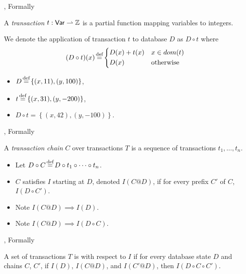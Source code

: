 \documentclass[xcolor={dvipsnames,svgnames,table}]{beamer}
\newcommand{\defeq}{\stackrel{\mathclap{\normalfont\mbox{\scriptsize def}}}{=}}
\newcommand{\set}[1]{\left\{#1\right\}}
\begin{document}
\begin{frame}{\iconfluence{}, Formally}
  \begin{center}
    \huge
    A \emph{transaction} $t: \textsf{Var} \rightharpoonup \mathbb{Z}$ is a partial function
    mapping variables to integers.
  \end{center}
  We denote the application of transaction $t$ to database $D$ as $D \circ t$
  where
  \[
    (D \circ t)(x) \defeq \begin{cases*}
      D(x) + t(x) & $x \in dom(t)$ \\
      D(x)        & otherwise
    \end{cases*}
  \]
  \begin{itemize}
    \item $D \defeq \set{(x, 11), (y, 100)}$,
    \item $t \defeq \set{(x, 31), (y, -200)}$,
    \item $D \circ t = \set{(x, 42), (y, -100)}$.
  \end{itemize}
\end{frame}

\begin{frame}{\iconfluence{}, Formally}
  \begin{center}
    \huge
    A \emph{transaction chain} $C$ over transactions $T$ is a sequence of
    transactions $t_1, \ldots, t_n$.
  \end{center}
  \begin{itemize}
    \item Let $D \circ C \defeq D \circ t_1 \circ \cdots \circ t_n$.
    \item
      $C$ satisfies $I$ starting at $D$, denoted $I(C @ D)$, if for every
      prefix $C'$ of $C$, $I(D \circ C')$.
    \item
      Note $I(C@D) \implies I(D)$.
    \item
      Note $I(C@D) \implies I(D \circ C)$.
  \end{itemize}
\end{frame}

\begin{frame}{\iconfluence{}, Formally}
  \begin{center}
    \huge
    A set of transactions $T$ is \emph{\iconfluent{}} with respect to $I$ if
    for every database state $D$ and chains $C$, $C'$, if $I(D)$, $I(C@D)$, and
    $I(C'@D)$, then $I(D \circ C \circ C')$.
  \end{center}
\end{frame}

\newcommand{\inva}{x + y \geq 0}
\newcommand{\invb}{x - y \leq 0}
\newcommand{\invc}{y \geq 1}
\newcommand{\invd}{y \geq 3}
\newcommand{\inv}{(\inva \land \invb \land \invc) \lor (\invd)}
\end{document}
